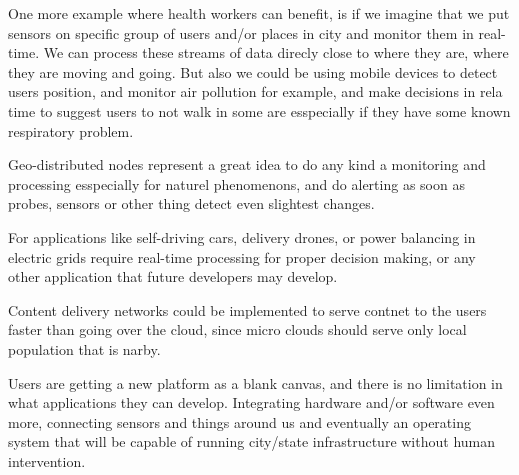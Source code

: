 One more example where health workers can benefit, is if we imagine that we put sensors on specific group of users and/or places in city and monitor them in real-time. We can process these streams of data direcly close to where they are, where they are moving and going. But also we could be using mobile devices to detect users position, and monitor air pollution for example, and make decisions in rela time to suggest users to not walk in some are esspecially if they have some known respiratory problem.

Geo-distributed nodes represent a great idea to do any kind a monitoring and processing esspecially for naturel phenomenons, and do alerting as soon as probes, sensors or other thing detect even slightest changes.

For applications like self-driving cars, delivery drones, or power balancing in electric grids require real-time processing for proper decision making, or any other application that future developers may develop.

Content delivery networks could be implemented to serve contnet to the users faster than going over the cloud, since micro clouds should serve only local population that is narby.

Users are getting a new platform as a blank canvas, and there is no limitation in what applications they can develop. Integrating hardware and/or software even more, connecting sensors and things around us and eventually an operating system that will be capable of running city/state infrastructure without human intervention.
%
%